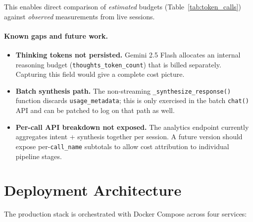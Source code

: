 \documentclass[12pt,a4paper]{article}
\begin{document}
This enables direct comparison of \emph{estimated} budgets
(Table~\ref{tab:token_calls}) against \emph{observed} measurements
from live sessions.

\paragraph{Known gaps and future work.}

\begin{itemize}
  \item \textbf{Thinking tokens not persisted.}
    Gemini 2.5 Flash allocates an internal reasoning budget
    (\texttt{thoughts\_token\_count}) that is billed separately.
    Capturing this field would give a complete cost picture.
  \item \textbf{Batch synthesis path.}
    The non-streaming \texttt{\_synthesize\_response()} function
    discards \texttt{usage\_metadata}; this is only exercised in
    the batch \texttt{chat()} API and can be patched
    to log on that path as well.
  \item \textbf{Per-call API breakdown not exposed.}
    The analytics endpoint currently aggregates intent + synthesis
    together per session.
    A future version should expose per-\texttt{call\_name} subtotals
    to allow cost attribution to individual pipeline stages.
\end{itemize}

\section{Deployment Architecture}
\label{sec:deploy}

The production stack is orchestrated with Docker Compose across
four services:
\end{document}

